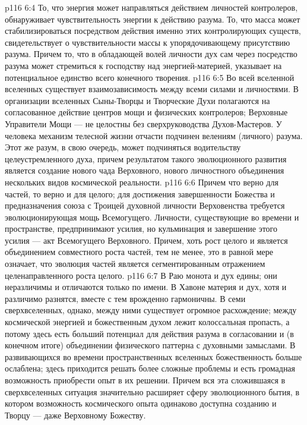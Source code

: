\vs p116 6:4 \pc То, что энергия может направляться действием личностей контролеров, обнаруживает чувствительность энергии к действию разума. То, что масса может стабилизироваться посредством действия именно этих контролирующих существ, свидетельствует о чувствительности массы к упорядочивающему присутствию разума. Причем то, что в обладающей волей личности дух сам через посредство разума может стремиться к господству над энергией\hyp{}материей, указывает на потенциальное единство всего конечного творения.
\vs p116 6:5 Во всей вселенной вселенных существует взаимозависимость между всеми силами и личностями. В организации вселенных Сыны\hyp{}Творцы и Творческие Духи полагаются на согласованное действие центров мощи и физических контролеров; Верховные Управители Мощи --- не целостны без сверхруководства Духов\hyp{}Мастеров. У человека механизм телесной жизни отчасти подчинен велениям (личного) разума. Этот же разум, в свою очередь, может подчиняться водительству целеустремленного духа, причем результатом такого эволюционного развития является создание нового чада Верховного, нового личностного объединения нескольких видов космической реальности.
\vs p116 6:6 Причем что верно для частей, то верно и для целого; для достижения завершенности Божества и предназначения союза с Троицей духовной личности Верховенства требуется эволюционирующая мощь Всемогущего. Личности, существующие во времени и пространстве, предпринимают усилия, но кульминация и завершение этого усилия --- акт Всемогущего Верховного. Причем, хоть рост целого и является объединением совместного роста частей, тем не менее, это в равной мере означает, что эволюция частей является сегментированным отражением целенаправленного роста целого.
\vs p116 6:7 В Раю монота и дух едины; они неразличимы и отличаются только по имени. В Хавоне материя и дух, хотя и различимо разнятся, вместе с тем врожденно гармоничны. В семи сверхвселенных, однако, между ними существует огромное расхождение; между космической энергией и божественным духом лежит колоссальная пропасть, а потому здесь есть больший потенциал для действия разума в согласовании и (в конечном итоге) объединении физического паттерна с духовными замыслами. В развивающихся во времени пространственных вселенных божественность больше ослаблена; здесь приходится решать более сложные проблемы и есть громадная возможность приобрести опыт в их решении. Причем вся эта сложившаяся в сверхвселенных ситуация значительно расширяет сферу эволюционного бытия, в котором возможность космического опыта одинаково доступна созданию и Творцу --- даже Верховному Божеству.
